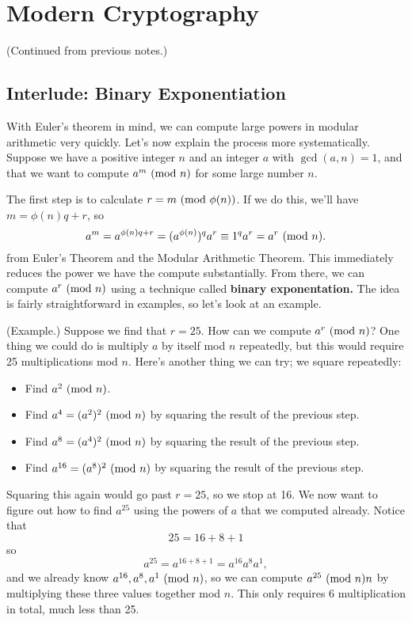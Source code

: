 \documentclass[letterpaper]{article}
\begin{document}
\section{Modern Cryptography}
(Continued from previous notes.)


\subsection{Interlude: Binary Exponentiation}
With Euler's theorem in mind, we can compute large powers in modular arithmetic very quickly. Let's now explain the process more systematically. Suppose we have a positive integer $n$ and an integer $a$ with $\gcd(a, n) = 1$, and that we want to compute $a^m \ (\mathrm{mod}\ n)$ for some large number $n$.

\bigskip 

The first step is to calculate $r = m \ (\mathrm{mod}\ \phi(n))$. If we do this, we'll have $m = \phi(n)q + r$, so \begin{equation}
    a^m = a^{\phi(n) q + r} = (a^{\phi(n)})^q a^r \equiv 1^q a^r = a^r \ (\mathrm{mod}\ n).
\end{equation}
from Euler's Theorem and the Modular Arithmetic Theorem. This immediately reduces the power we have the compute substantially. From there, we can compute $a^r \ (\mathrm{mod}\ n)$ using a technique called \textbf{binary exponentation.} The idea is fairly straightforward in examples, so let's look at an example. 

\begin{mdframed}
    (Example.) Suppose we find that $r = 25$. How can we compute $a^r \ (\mathrm{mod}\ n)$? One thing we could do is multiply $a$ by itself mod $n$ repeatedly, but this would require 25 multiplications mod $n$. Here's another thing we can try; we square repeatedly: 
    \begin{itemize}
        \item Find $a^2 \ (\mathrm{mod}\ n)$. 
        \item Find $a^4 = (a^2)^2 \ (\mathrm{mod}\ n)$ by squaring the result of the previous step.
        \item Find $a^8 = (a^4)^2 \ (\mathrm{mod}\ n)$ by squaring the result of the previous step.
        \item Find $a^{16} = (a^8)^2 \ (\mathrm{mod}\ n)$ by squaring the result of the previous step.
    \end{itemize}
    Squaring this again would go past $r = 25$, so we stop at 16. We now want to figure out how to find $a^{25}$ using the powers of $a$ that we computed already. Notice that \[25 = 16 + 8 + 1\] so \[a^{25} = a^{16 + 8 + 1} = a^{16}a^{8}a^{1},\] and we already know $a^{16}, a^8, a^1 \ (\mathrm{mod}\ n)$, so we can compute $a^{25} \ (\mathrm{mod}\ n) n$ by multiplying these three values together mod $n$. This only requires 6 multiplication in total, much less than 25.
\end{mdframed}
\end{document}
